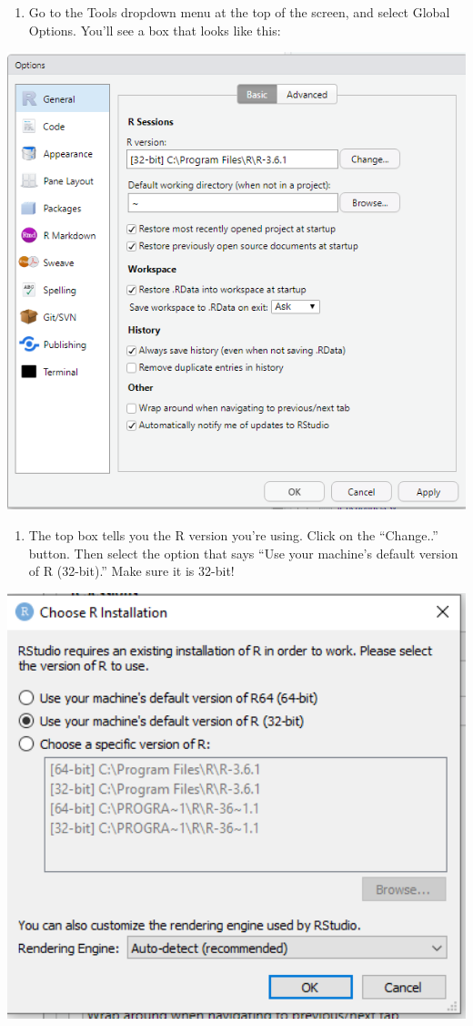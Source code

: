 \documentclass[]{book}
\providecommand{\tightlist}{%
  \setlength{\itemsep}{0pt}\setlength{\parskip}{0pt}}
\begin{document}
\begin{enumerate}
\def\labelenumi{\arabic{enumi})}
\tightlist
\item
  Go to the Tools dropdown menu at the top of the screen, and select Global Options. You'll see a box that looks like this:
\end{enumerate}

\includegraphics[width=8.18in]{images/options}

\begin{enumerate}
\def\labelenumi{\arabic{enumi})}
\setcounter{enumi}{1}
\tightlist
\item
  The top box tells you the R version you're using. Click on the ``Change..'' button. Then select the option that says ``Use your machine's default version of R (32-bit).'' Make sure it is 32-bit!
\end{enumerate}

\includegraphics[width=5.53in]{images/version}
\end{document}
